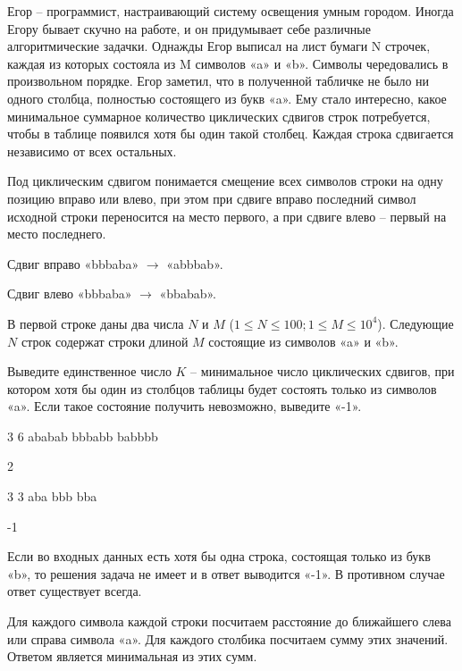 
Егор – программист, настраивающий систему освещения умным городом. Иногда Егору бывает скучно на работе, и он придумывает себе различные алгоритмические задачки. Однажды Егор выписал на лист бумаги N строчек, каждая из которых состояла из M символов «a» и «b». Символы чередовались в произвольном порядке. Егор заметил, что в полученной табличке не было ни одного столбца, полностью состоящего из букв «a». Ему стало интересно, какое минимальное суммарное количество циклических сдвигов строк потребуется, чтобы в таблице появился хотя бы один такой столбец. Каждая строка сдвигается независимо от всех остальных.

Под циклическим сдвигом понимается смещение всех символов строки на одну позицию вправо или влево, при этом при сдвиге вправо последний символ исходной строки переносится на место первого, а при сдвиге влево – первый на место последнего.

Сдвиг вправо «bbbaba» $ \rightarrow $ «abbbab».

Сдвиг влево «bbbaba» $ \rightarrow $ «bbabab».


В первой строке
даны два числа $ N $ и $ M $
($ 1 \le N \le 100; 1 \le M \le 10^4 $). Следующие
$ N $ строк
содержат строки длиной $ M $ состоящие из символов «a» и «b».

\outputfmtSection

Выведите
единственное число $ K $ – минимальное число циклических сдвигов, при котором хотя бы
один из столбцов таблицы будет состоять только из символов «a». Если такое состояние получить невозможно,
выведите «-1».


\begin{myverbbox}[\small]{\vinput}
    3 6
    ababab
    bbbabb
    babbbb
\end{myverbbox}
\begin{myverbbox}[\small]{\voutput}
    2
\end{myverbbox}


\begin{myverbbox}[\small]{\vinput}
    3 3
    aba
    bbb
    bba
\end{myverbbox}
\begin{myverbbox}[\small]{\voutput}
    -1
\end{myverbbox}

\solutionSection

Если во входных данных есть хотя бы одна строка, состоящая только из букв «b», 
то решения задача не имеет и в ответ выводится «-1». В противном случае ответ существует всегда.

Для каждого символа каждой строки посчитаем расстояние до ближайшего слева или справа символа «a». 
Для каждого столбика посчитаем сумму этих значений. Ответом является минимальная из этих сумм.

